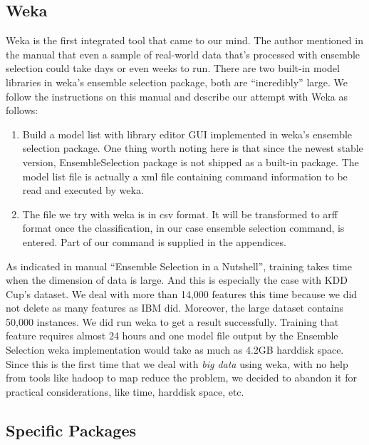 \documentclass[journal]{IEEEtran}
\begin{document}
\subsection{Weka}
\label{sec:weka}

Weka is the first integrated tool that came to our mind. The author
mentioned in the manual that even a sample of real-world data that's
processed with ensemble selection could take days or even weeks to
run\cite{ref:ensembleselectionnutshell}. There are two built-in model
libraries in weka's ensemble selection package, both are
``incredibly'' large. We follow the instructions on this manual and
describe our attempt with Weka as follows:
\begin{enumerate}
\item Build a model list with library editor GUI implemented in weka's
  ensemble selection package. One thing worth noting here is that
  since the newest stable version, EnsembleSelection package is not
  shipped as a built-in package. The model list file is actually a xml
  file containing command information to be read and executed by
  weka. 
\item The file we try with weka is in csv format. It will be
  transformed to arff format once the classification, in our case
  ensemble selection command, is entered. Part of our command is
  supplied in the appendices.
\end{enumerate}
As indicated in manual ``Ensemble Selection in a Nutshell'', training
takes time when the dimension of data is large. And this is especially
the case with KDD Cup's dataset. We deal with more than 14,000
features this time because we did not delete as many features as IBM
did. Moreover, the large dataset contains 50,000 instances. We did run
weka to get a result successfully. Training that feature requires
almost 24 hours and one model file output by the Ensemble Selection
weka implementation would take as much as 4.2GB harddisk space. Since
this is the first time that we deal with \emph{big data} using weka,
with no help from tools like hadoop to map reduce the problem, we
decided to abandon it for practical considerations, like time,
harddisk space, etc. 





 


\subsection{Specific Packages}
\label{sec:shell-script}
\end{document}
